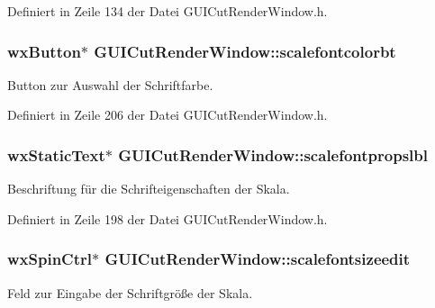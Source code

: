 Definiert in Zeile 134 der Datei G\-U\-I\-Cut\-Render\-Window.\-h.

\hypertarget{classGUICutRenderWindow_a13a1557216de339d20189fdaa0df482b}{
\subsubsection[{scalefontcolorbt}]{\setlength{\rightskip}{0pt plus 5cm}wx\-Button$\ast$ G\-U\-I\-Cut\-Render\-Window\-::scalefontcolorbt\hspace{0.3cm}{\ttfamily [private]}}}\label{classGUICutRenderWindow_a13a1557216de339d20189fdaa0df482b}
Button zur Auswahl der Schriftfarbe. 

Definiert in Zeile 206 der Datei G\-U\-I\-Cut\-Render\-Window.\-h.

\hypertarget{classGUICutRenderWindow_a1f46a30a61ad94b76a6194758bdb3f95}{
\subsubsection[{scalefontpropslbl}]{\setlength{\rightskip}{0pt plus 5cm}wx\-Static\-Text$\ast$ G\-U\-I\-Cut\-Render\-Window\-::scalefontpropslbl\hspace{0.3cm}{\ttfamily [private]}}}\label{classGUICutRenderWindow_a1f46a30a61ad94b76a6194758bdb3f95}
Beschriftung für die Schrifteigenschaften der Skala. 

Definiert in Zeile 198 der Datei G\-U\-I\-Cut\-Render\-Window.\-h.

\hypertarget{classGUICutRenderWindow_a62cb232f5f9747c1fdbc5c1f6ff4b7a4}{
\subsubsection[{scalefontsizeedit}]{\setlength{\rightskip}{0pt plus 5cm}wx\-Spin\-Ctrl$\ast$ G\-U\-I\-Cut\-Render\-Window\-::scalefontsizeedit\hspace{0.3cm}{\ttfamily [private]}}}\label{classGUICutRenderWindow_a62cb232f5f9747c1fdbc5c1f6ff4b7a4}
Feld zur Eingabe der Schriftgröße der Skala. 

